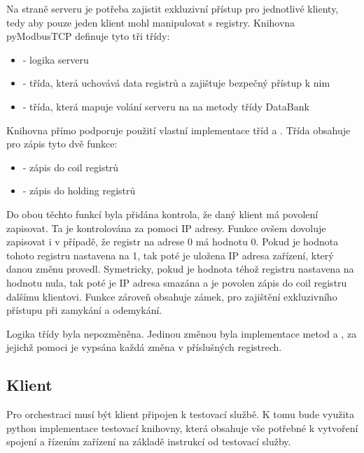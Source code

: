 Na straně serveru je potřeba zajistit exkluzivní přístup pro jednotlivé klienty, tedy aby pouze jeden klient mohl manipulovat s registry. Knihovna pyModbusTCP definuje tyto tři třídy:

\begin{itemize}
    \item {} - logika serveru
    \item {} - třída, která uchovává data registrů a zajištuje bezpečný přístup k nim
    \item {} - třída, která mapuje volání serveru na na metody třídy DataBank
\end{itemize}

Knihovna přímo podporuje použití vlastní implementace tříd  a . Třída  obsahuje pro zápis tyto dvě funkce:

\begin{itemize}
    \item {} - zápis do coil registrů 
    \item {} - zápis do holding registrů
\end{itemize}

Do obou těchto funkcí byla přidána kontrola, že daný klient má povolení zapisovat. Ta je kontrolována za pomoci IP adresy. Funkce  ovšem dovoluje zapisovat i v případě, že registr na adrese 0 má hodnotu 0. Pokud je hodnota tohoto registru nastavena na 1, tak poté je uložena IP adresa zařízení, který danou změnu provedl. Symetricky, pokud je hodnota téhož registru nastavena na hodnotu nula, tak poté je IP adresa smazána a je povolen zápis do coil registru dalšímu klientovi. Funkce zároveň obsahuje zámek, pro zajištění exkluzivního přístupu při zamykání a odemykání. 

Logika třídy  byla nepozměněna. Jedinou změnou byla implementace metod  a , za jejichž pomoci je vypsána každá změna v příslušných registrech. 

\subsection{Klient}

Pro orchestraci musí být klient připojen k testovací službě. K tomu bude využita python implementace testovací knihovny, která obsahuje vše potřebné k vytvoření spojení a řízením zařízení na základě instrukcí od testovací služby. 

